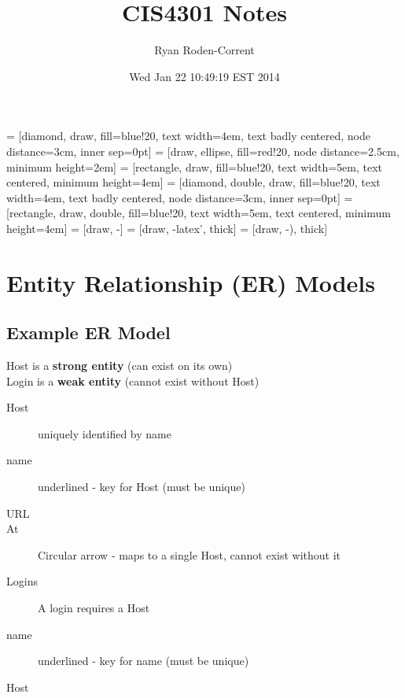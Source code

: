 \documentclass{article}
\title{CIS4301 Notes}
\author{Ryan Roden-Corrent}
\date{Wed Jan 22 10:49:19 EST 2014}
\begin{document}
\setlength\parindent{0pt}
 = [diamond, draw, fill=blue!20, text width=4em,
  text badly centered, node distance=3cm, inner sep=0pt]
 = [draw, ellipse, fill=red!20, node distance=2.5cm,
  minimum height=2em]
 = [rectangle, draw, fill=blue!20, text width=5em,
  text centered, minimum height=4em]
 = [diamond, double, draw, fill=blue!20, text width=4em,
  text badly centered, node distance=3cm, inner sep=0pt]
 = [rectangle, draw, double, fill=blue!20, text width=5em,
  text centered, minimum height=4em]
 = [draw, -]
 = [draw, -latex', thick]
 = [draw, -), thick]
\maketitle

\section{Entity Relationship (ER) Models}
\subsection{Example ER Model}

\begin{figure}[H]
\end{figure}

Host is a \textbf{strong entity} (can exist on its own)\\
Login is a \textbf{weak entity} (cannot exist without Host)\\
\begin{description}
  \item[Host] uniquely identified by name
  \item[name] underlined - key for Host (must be unique)
  \item[URL]
  \item[At] Circular arrow - maps to a single Host, cannot exist without it
  \item[Logins] A login requires a Host
  \item[name] underlined - key for name (must be unique)
  \item[Host]
\end{description}
\end{document}
